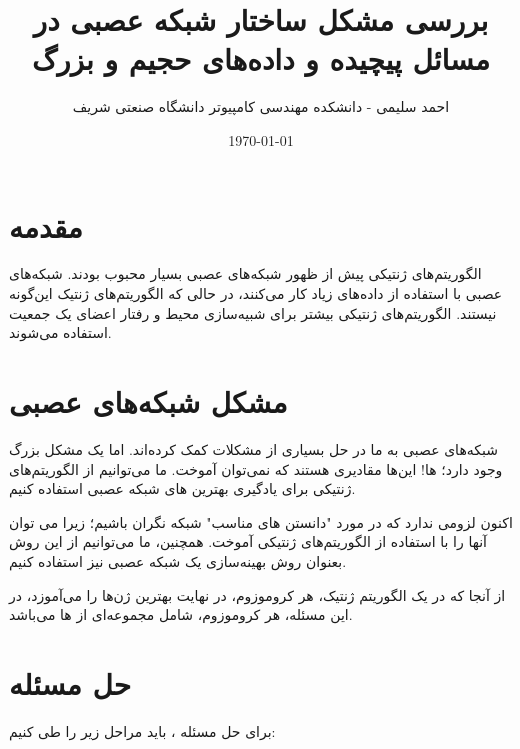 \documentclass[12pt,onecolumn,a4paper]{article}
\begin{document}
\title{
بررسی مشکل ساختار شبکه عصبی در مسائل پیچیده و داده‌های حجیم و بزرگ
}
\author{
احمد سلیمی - دانشکده مهندسی کامپیوتر دانشگاه صنعتی شریف
}
\date{\today}
\maketitle

\section{مقدمه}

الگوریتم‌های ژنتیکی پیش از ظهور شبکه‌های عصبی بسیار محبوب بودند. شبکه‌های عصبی با استفاده از داده‌های زیاد کار می‌کنند، در حالی که الگوریتم‌های ژنتیک این‌گونه نیستند.
الگوریتم‌های ژنتیکی بیشتر برای شبیه‌سازی محیط و رفتار اعضای یک جمعیت استفاده می‌شوند.

\section{مشکل شبکه‌های عصبی}

شبکه‌های عصبی به ما در حل بسیاری از مشکلات کمک کرده‌اند. اما یک مشکل بزرگ وجود دارد؛
ها! این‌ها مقادیری هستند که نمی‌توان آموخت. ما می‌توانیم از الگوریتم‌های ژنتیکی برای یادگیری بهترین
های شبکه عصبی استفاده کنیم.

اکنون لزومی ندارد که در مورد "دانستن
های مناسب" شبکه نگران باشیم؛ زیرا می توان آنها را با استفاده از الگوریتم‌های ژنتیکی آموخت. همچنین، ما می‌توانیم از این روش بعنوان روش بهینه‌سازی یک شبکه عصبی نیز استفاده کنیم.

از آنجا که در یک الگوریتم ژنتیک، هر کروموزوم، در نهایت بهترین ژن‌ها را می‌آموزد، در این مسئله، هر کروموزوم، شامل مجموعه‌ای از
ها می‌باشد.

\section{حل مسئله}

برای حل مسئله
،
باید مراحل زیر را طی کنیم:
\end{document}
